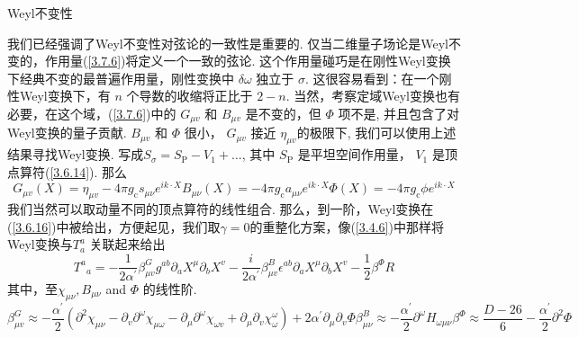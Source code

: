 \centerline{\Large Weyl不变性}

我们已经强调了Weyl不变性对弦论的一致性是重要的. 仅当二维量子场论是Weyl不变的，作用量(\ref{3.7.6})将定义一个一致的弦论. 这个作用量碰巧是在刚性Weyl变换下经典不变的最普遍作用量，刚性变换中 $\delta \omega$ 独立于 $\sigma$. 这很容易看到：在一个刚性Weyl变换下，有 $n$ 个导数的收缩将正比于 $2-n $. 当然，考察定域Weyl变换也有必要，在这个域，(\ref{3.7.6})中的 $G_{\mu v}$ 和 $B_{\mu v}$ 是不变的，但 $\Phi$ 项不是, 并且包含了对Weyl变换的量子贡献. $B_{\mu v}$ 和 $\Phi$ 很小， $G_{\mu v}$ 接近 $\eta_{\mu v}$的极限下, 我们可以使用上述结果寻找Weyl变换.  写成$S_{\sigma}=S_{\mathrm{P}}-V_{1}+\ldots$, 其中 $S_{\mathrm{P}}$ 是平坦空间作用量， $V_{1}$ 是顶点算符(\ref{3.6.14}). 那么
\begin{subequations}
\begin{equation}
G_{\mu v}(X)=\eta_{\mu v}-4 \pi g_{\mathrm{c}} s_{\mu \nu} e^{i k \cdot X}
\end{equation}
\begin{equation}
B_{\mu \nu}(X)=-4 \pi g_{\mathrm{c}} a_{\mu \nu} e^{i k \cdot X}
\end{equation}
\begin{equation}
\Phi(X)=-4 \pi g_{\mathrm{c}} \phi e^{i k \cdot X}
\end{equation}
\end{subequations}
我们当然可以取动量不同的顶点算符的线性组合. 那么，到一阶，Weyl变换在(\ref{3.6.16})中被给出，方便起见，我们取$\gamma=0$的重整化方案，像(\ref{3.4.6})中那样将Weyl变换与$T_a^a$ 关联起来给出
\begin{equation}
T^{a}{ }_{a}=-\frac{1}{2 \alpha^{\prime}} \beta_{\mu v}^{G} g^{a b} \partial_{a} X^{\mu} \partial_{b} X^{v}-\frac{i}{2 \alpha^{\prime}} \beta_{\mu v}^{B} \epsilon^{a b} \partial_{a} X^{\mu} \partial_{b} X^{v}-\frac{1}{2} \beta^{\Phi} R
\end{equation}
其中，至$\chi_{\mu \nu}, B_{\mu \nu}$ and $\Phi$ 的线性阶.
\begin{subequations}\label{3.7.13}
\begin{equation}
\beta_{\mu v}^{G} \approx-\frac{\alpha^{\prime}}{2}\left(\partial^{2} \chi_{\mu \nu}-\partial_{v} \partial^{\omega} \chi_{\mu \omega}-\partial_{\mu} \partial^{\omega} \chi_{\omega v}+\partial_{\mu} \partial_{v} \chi_{\omega}^{\omega}\right)+2 \alpha^{\prime} \partial_{\mu} \partial_{v} \Phi
\end{equation}
\begin{equation}
\beta_{\mu \nu}^{B} \approx-\frac{\alpha^{\prime}}{2} \partial^{\omega} H_{\omega \mu \nu}
\end{equation}
\begin{equation}
\beta^{\Phi} \approx \frac{D-26}{6}-\frac{\alpha^{\prime}}{2} \partial^{2} \Phi
\end{equation}
\end{subequations}
